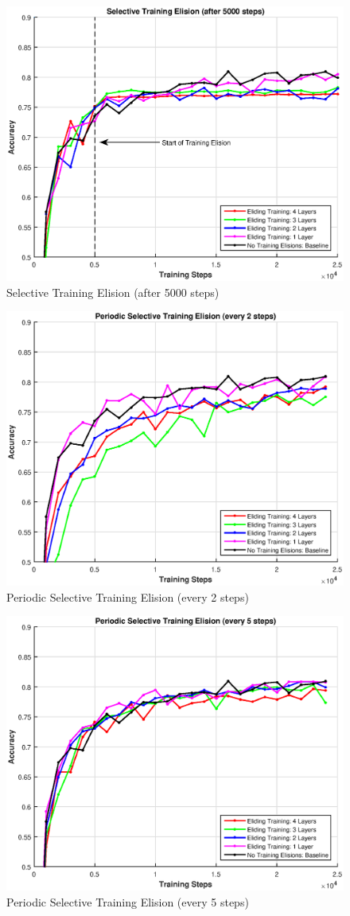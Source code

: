 \begin{figure}[t]
	\centering
	\includegraphics[width=0.8\columnwidth]{figures/approx.eps}
	\caption{Selective Training Elision (after 5000 steps)}
	\label{fig:approx}
\end{figure}
\begin{figure}[t]
	\centering
	\includegraphics[width=0.8\columnwidth]{figures/periodic-approx-2.eps}
	\caption{Periodic Selective Training Elision (every 2 steps)}
	\label{fig:periodic-approx-2}
\end{figure}
\begin{figure}[t]
	\centering
	\includegraphics[width=0.8\columnwidth]{figures/periodic-approx-5.eps}
	\caption{Periodic Selective Training Elision (every 5 steps)}
	\label{fig:periodic-approx-5}
\end{figure}

